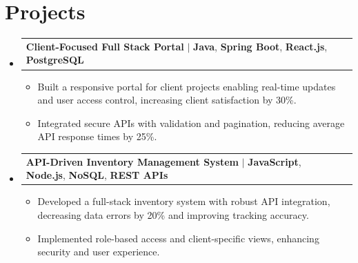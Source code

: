 \documentclass[letterpaper,10pt]{article}
\makeatletter
\newcommand{\resumeItem}[1]{
  \item{\fontsize{8pt}{9pt}\selectfont
    #1 \vspace{-3pt}
  }
}
\newcommand{\resumeProjectHeading}[2]{
    \item
    \begin{tabular*}{1.001\textwidth}{l@{\extracolsep{\fill}}r}
      \fontsize{8.5pt}{10pt}#1 & \textbf{\fontsize{8.5pt}{10pt} #2}\\
    \end{tabular*}\vspace{-7pt}
}
\newcommand{\resumeSubHeadingListStart}{\begin{itemize}[leftmargin=0pt, label={}]}
\newcommand{\resumeSubHeadingListEnd}{\end{itemize}}
\newcommand{\resumeItemListStart}{\begin{itemize}[leftmargin=*]}
\newcommand{\resumeItemListEnd}{\end{itemize}\vspace{-5pt}}
\makeatother
\begin{document}
\section{Projects}
    \vspace{-5pt}
    \resumeSubHeadingListStart
          \resumeProjectHeading
            {\textbf{Client-Focused Full Stack Portal} $|$ \textbf{Java}, \textbf{Spring Boot}, \textbf{React.js}, \textbf{PostgreSQL}}{}
            \resumeItemListStart
                \resumeItem{Built a responsive portal for client projects enabling real-time updates and user access control, increasing client satisfaction by 30\%.}
                \resumeItem{Integrated secure APIs with validation and pagination, reducing average API response times by 25\%.}
            \resumeItemListEnd
        \vspace{-12pt}
    
        \resumeProjectHeading
            {\textbf{API-Driven Inventory Management System} $|$ \textbf{JavaScript}, \textbf{Node.js}, \textbf{NoSQL}, \textbf{REST APIs}}{}
        \resumeItemListStart
                \resumeItem{Developed a full-stack inventory system with robust API integration, decreasing data errors by 20\% and improving tracking accuracy.}
                \resumeItem{Implemented role-based access and client-specific views, enhancing security and user experience.}
        \resumeItemListEnd
      \vspace{-12pt}
    \resumeSubHeadingListEnd
\end{document}
